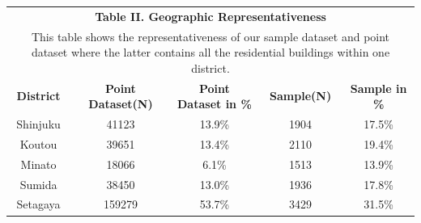 \documentclass[a4paper, 12pt]{article} %
\begin{document}
\begin{table}[!htbp] \centering 
\label{tb2}
\begin{tabular}{ccccc}
\multicolumn{5}{c}{\textbf{Table II. Geographic Representativeness}} \\
\multicolumn{5}{p{14cm}}{This table shows the representativeness of our sample dataset and point dataset where the latter contains all the residential buildings within one district.} \\
\hline
\textbf{District} & \textbf{Point Dataset(N)} & \textbf{Point Dataset in \%} & \textbf{Sample(N)} & \textbf{Sample in \%} \\
\hline
Shinjuku & 41123 & 13.9\% & 1904 & 17.5\% \\
Koutou & 39651 & 13.4\% & 2110 & 19.4\% \\
Minato & 18066 & 6.1\% & 1513 & 13.9\% \\
Sumida & 38450 & 13.0\% & 1936 & 17.8\% \\
Setagaya & 159279 & 53.7\% & 3429 & 31.5\% \\ 
\hline
\end{tabular}
\end{table}
\end{document}
